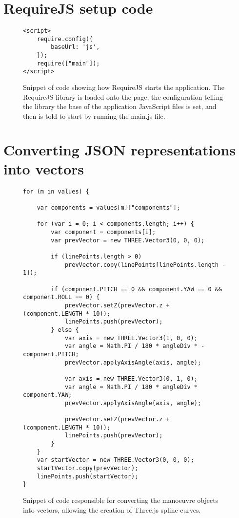 \section{RequireJS setup code}
\label{code:requireJS}
\begin{figure}[h!]
\caption{Snippet of code showing how RequireJS starts the application. The RequireJS library is loaded onto the page, the configuration telling the library the base of the application JavaScript files is set, and then is told to start by running the main.js file.}
\begin{lstlisting}
<script>
    require.config({
        baseUrl: 'js',
    });
    require(["main"]);
</script>
\end{lstlisting}
\end{figure}

\clearpage

\section{Converting JSON representations into vectors}
\label{code:jsonmovesJS}
\begin{figure}[h!]
\caption{Snippet of code responsible for converting the manoeuvre objects into vectors, allowing the creation of Three.js spline curves.}
\begin{lstlisting}
for (m in values) {

    var components = values[m]["components"];

    for (var i = 0; i < components.length; i++) {
        var component = components[i];
        var prevVector = new THREE.Vector3(0, 0, 0);

        if (linePoints.length > 0)
            prevVector.copy(linePoints[linePoints.length - 1]);

        if (component.PITCH == 0 && component.YAW == 0 && component.ROLL == 0) {
            prevVector.setZ(prevVector.z + (component.LENGTH * 10));
            linePoints.push(prevVector);
        } else {
            var axis = new THREE.Vector3(1, 0, 0);
            var angle = Math.PI / 180 * angleDiv * -component.PITCH;
            prevVector.applyAxisAngle(axis, angle);

            var axis = new THREE.Vector3(0, 1, 0);
            var angle = Math.PI / 180 * angleDiv * component.YAW;
            prevVector.applyAxisAngle(axis, angle);

            prevVector.setZ(prevVector.z + (component.LENGTH * 10));
            linePoints.push(prevVector);
        }
    }
    var startVector = new THREE.Vector3(0, 0, 0);
    startVector.copy(prevVector);
    linePoints.push(startVector);
}
\end{lstlisting}
\end{figure}

